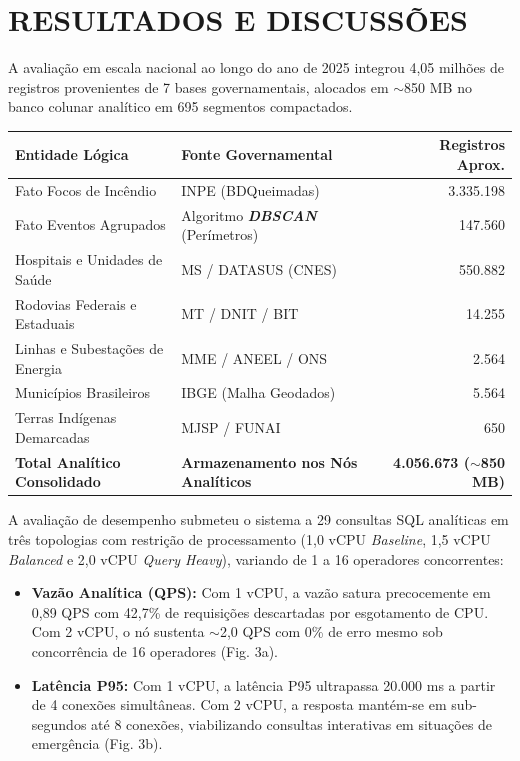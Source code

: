 \section*{RESULTADOS E DISCUSSÕES}

A avaliação em escala nacional ao longo do ano de 2025 integrou 4,05 milhões de registros provenientes de 7 bases governamentais, alocados em $\sim$850 MB no banco colunar analítico em 695 segmentos compactados.

\begin{center}
\vspace{-0.10cm}
{\fontsize{16}{20}\selectfont
\begin{tabular}{llr}
\hline
\textbf{Entidade Lógica} & \textbf{Fonte Governamental} & \textbf{Registros Aprox.} \\
\hline
Fato Focos de Incêndio & INPE (BDQueimadas) & 3.335.198 \\
Fato Eventos Agrupados & Algoritmo \textbf{\textit{DBSCAN}} (Perímetros) & 147.560 \\
Hospitais e Unidades de Saúde & MS / DATASUS (CNES) & 550.882 \\
Rodovias Federais e Estaduais & MT / DNIT / BIT & 14.255 \\
Linhas e Subestações de Energia & MME / ANEEL / ONS & 2.564 \\
Municípios Brasileiros & IBGE (Malha Geodados) & 5.564 \\
Terras Indígenas Demarcadas & MJSP / FUNAI & 650 \\
\hline
\textbf{Total Analítico Consolidado} & \textbf{Armazenamento nos Nós Analíticos} & \textbf{4.056.673 ($\sim$850 MB)} \\
\hline
\end{tabular}
}
\vspace{0.08cm}
\label{tab:volumetria}
\end{center}

\vfill\null\columnbreak

A avaliação de desempenho submeteu o sistema a 29 consultas SQL analíticas em três topologias com restrição de processamento (1,0 vCPU \textit{Baseline}, 1,5 vCPU \textit{Balanced} e 2,0 vCPU \textit{Query Heavy}), variando de 1 a 16 operadores concorrentes:
\begin{itemize}[leftmargin=1.0cm, itemsep=0.06cm, topsep=0.04cm]
    \item \textbf{Vazão Analítica (QPS):} Com 1 vCPU, a vazão satura precocemente em 0,89 QPS com 42,7\% de requisições descartadas por esgotamento de CPU. Com 2 vCPU, o nó sustenta $\sim$2,0 QPS com 0\% de erro mesmo sob concorrência de 16 operadores (Fig. 3a).
    \item \textbf{Latência P95:} Com 1 vCPU, a latência P95 ultrapassa 20.000 ms a partir de 4 conexões simultâneas. Com 2 vCPU, a resposta mantém-se em sub-segundos até 8 conexões, viabilizando consultas interativas em situações de emergência (Fig. 3b).
\end{itemize}

